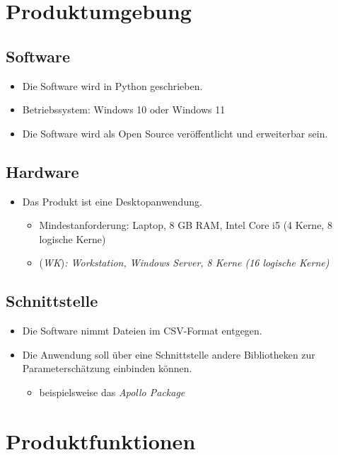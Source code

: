 \documentclass{article}
\begin{document}
\clearpage
\section{Produktumgebung}
\subsection{Software}
\begin{itemize}
    \item Die Software wird in Python geschrieben.
    \item Betriebssystem: Windows 10 oder Windows 11
    \item Die Software wird als Open Source veröffentlicht und erweiterbar sein.
\end{itemize}
\subsection{Hardware}
\begin{itemize}
    \item Das Produkt ist eine Desktopanwendung.
    \begin{itemize}
        \item Mindestanforderung: Laptop, 8 GB RAM, Intel Core i5 (4 Kerne, 8 logische Kerne)
        \item (\textit{WK})\textit{: Workstation, Windows Server, 8 Kerne (16 logische Kerne)}
    \end{itemize}
\end{itemize}
\subsection{Schnittstelle}
\begin{itemize}
    \item Die Software nimmt Dateien im CSV-Format entgegen.
    \item Die Anwendung soll über eine Schnittstelle andere Bibliotheken zur Parameterschätzung einbinden können.
    \begin{itemize}
        \item beispielsweise das \emph{Apollo Package}
    \end{itemize}
\end{itemize}

\clearpage
\section{Produktfunktionen}
\end{document}
